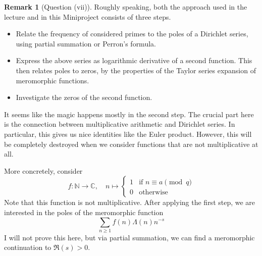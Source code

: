 \documentclass{scrartcl}
\newcommand{\N}{\mathbb{N}}
\newcommand{\C}{\mathbb{C}}
\theoremstyle{definition}
\newtheorem{remark}[definition]{Remark}
\begin{document}
\begin{remark}[Question (vii)]
    Roughly speaking, both the approach used in the lecture and in this Miniproject consists of three steps.
    \begin{itemize}
        \item Relate the frequency of considered primes to the poles of a Dirichlet series, using partial summation or Perron's formula.

        \item Express the above series as logarithmic derivative of a second function.
        This then relates poles to zeros, by the properties of the Taylor series expansion of meromorphic functions.

        \item Investigate the zeros of the second function.
    \end{itemize}

    It seems like the magic happens mostly in the second step.
    The crucial part here is the connection between multiplicative arithmetic and Dirichlet series.
    In particular, this gives us nice identities like the Euler product.
    However, this will be completely destroyed when we consider functions that are not multiplicative at all.

    More concretely, consider
    \begin{equation*}
        f: \N \to \C, \quad n \mapsto \begin{cases}
            1 & \text{if $n \equiv a \pmod q$} \\
            0 & \text{otherwise}
        \end{cases}
    \end{equation*}
    Note that this function is not multiplicative.
    After applying the first step, we are interested in the poles of the meromorphic function
    \begin{equation*}
        \sum_{n \geq 1} f(n) \Lambda(n) n^{-s}
    \end{equation*}
    I will not prove this here, but via partial summation, we can find a meromorphic continuation to $\Re(s) > 0$.


\end{remark}
\end{document}
